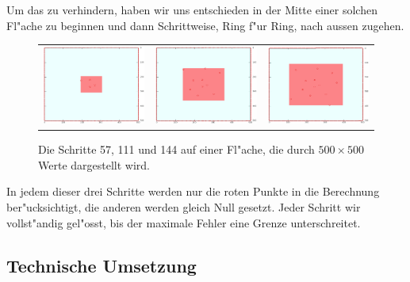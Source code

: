 \begin{refsection}
Um das zu verhindern, haben wir uns entschieden in der Mitte einer
solchen Fl"ache zu beginnen und dann Schrittweise, Ring f"ur Ring,
nach aussen zugehen.

\begin{figure}
\centering
\begin{tabular}{ccc}
\includegraphics[width=5.3cm]{green/images/resultate/grfl/step0057.png}
& \includegraphics[width=5.3cm]{green/images/resultate/grfl/step0111.png}
& \includegraphics[width=5.3cm]{green/images/resultate/grfl/step0144.png}
\end{tabular}		
\caption{Die Schritte 57, 111 und 144 auf einer Fl"ache, die durch
$500 \times 500$ Werte dargestellt wird.}
\label{fig:dreiSchritte}
\end{figure}
	
In jedem dieser drei Schritte werden nur die roten Punkte in die
Berechnung ber"ucksichtigt, die anderen werden gleich Null gesetzt.
Jeder Schritt wir vollst"andig gel"osst, bis der maximale Fehler
eine Grenze unterschreitet.
	
\subsection{Technische Umsetzung}
	

\end{refsection}
